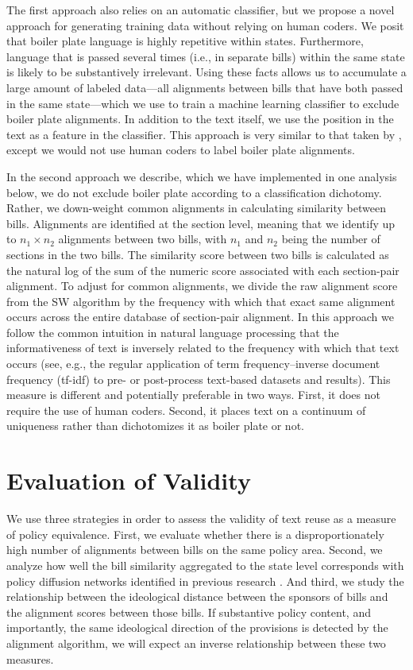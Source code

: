 \documentclass[12pt]{article} %
\begin{document}
The first approach also relies on an automatic classifier, but we propose a novel approach for
generating training data without relying on human coders. We posit that boiler plate language is highly repetitive within states. Furthermore, language
that is passed several times (i.e., in separate bills) within the same state is likely to be
substantively irrelevant. Using these facts allows us to accumulate a large amount of labeled data---all alignments between bills that have both passed in the same state---which we use to train a machine learning classifier to exclude boiler plate alignments. In addition to the text
itself, we use the position in the text as a feature in the classifier. This approach is very similar to that taken by \citet{wilkerson2015tracing}, except we would not use human coders to label boiler plate alignments.

In the second approach we describe, which we have implemented in one analysis below, we do not exclude boiler plate according to a classification dichotomy. Rather, we down-weight common alignments in calculating similarity between bills. Alignments are identified at the section level, meaning that we identify up to $n_1 \times n_2$ alignments between two bills, with $n_1$ and $n_2$ being the number of sections in the two bills. The similarity score between two bills is calculated as the natural log of the sum of the numeric score associated with each section-pair alignment. To adjust for common alignments, we divide the raw alignment score from the SW algorithm by the frequency with which that exact same alignment occurs across the entire database of section-pair alignment. In this approach we follow the common intuition in natural language processing that the informativeness of text is inversely related to the frequency with which that text occurs \citep{robertson2004understanding} (see, e.g., the regular application of term frequency–inverse document frequency (tf-idf) to pre- or post-process text-based datasets and results). This measure is different and potentially preferable in two ways. First, it does not require the use of human coders. Second, it places text on a continuum of uniqueness rather than dichotomizes it as boiler plate or not.



\section{Evaluation of Validity}

We use three strategies in order to assess the validity of text reuse as a measure of policy equivalence. First, we evaluate whether there is a disproportionately high number of alignments between bills on the same policy area. Second, we analyze how well the bill similarity aggregated to the state level corresponds with policy diffusion networks identified in previous research \citep{desmarais2015}. And third, we study the relationship between the ideological distance between the sponsors of bills and the alignment scores between those bills. If substantive policy content, and importantly, the same ideological direction of the provisions is detected by the alignment algorithm, we will expect an inverse relationship between these two measures.
\end{document}
